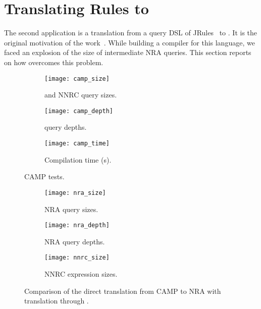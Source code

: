 \section{Translating Rules to \NRAEnv}
\label{sec:rules}

The second application is a translation from a query DSL of
JRules~\cite{jrules-book} to \NRAEnv.
%
It is the original motivation of the work~\cite{meta}.
%
While building a compiler for this language, we faced an explosion of
the size of intermediate NRA queries.
%
This section reports on how \NRAEnv overcomes this problem.

\begin{figure*}[t]
  \centering
  \begin{subfigure}[b]{0.329\textwidth}
    \texttt{[image: camp\_size]}
    \caption{\NRAEnv and NNRC query sizes.}
    \label{fig:camp-numbers:camp-size}
  \end{subfigure}
  \begin{subfigure}[b]{0.329\textwidth}
    \texttt{[image: camp\_depth]}
    \caption{\NRAEnv query depths.}
    \label{fig:camp-numbers:camp-depth}
  \end{subfigure}
  \begin{subfigure}[b]{0.329\textwidth}
    \texttt{[image: camp\_time]}
    \caption{Compilation time (s).}
    \label{fig:camp-numbers:camp-time}
  \end{subfigure}
  \caption{CAMP tests.}
  \label{fig:camp-numbers}
\end{figure*}
\vspace*{-0.3cm}
\begin{figure*}[t]
  \centering
  \begin{subfigure}[b]{0.329\textwidth}
    \texttt{[image: nra\_size]}
    \caption{NRA query sizes.}
    \label{fig:nra-numbers:nra-size}
  \end{subfigure}
  \begin{subfigure}[b]{0.329\textwidth}
    \texttt{[image: nra\_depth]}
    \caption{NRA query depths.}
    \label{fig:nra-numbers:nra-depth}
  \end{subfigure}
  \begin{subfigure}[b]{0.329\textwidth}
    \texttt{[image: nnrc\_size]}
    \caption{NNRC expression sizes.}
    \label{fig:nra-numbers:nnrc-size}
  \end{subfigure}
  \caption{Comparison of the direct translation from CAMP to NRA with translation
 through \NRAEnv.}
  \label{fig:nra-numbers}
\end{figure*}

